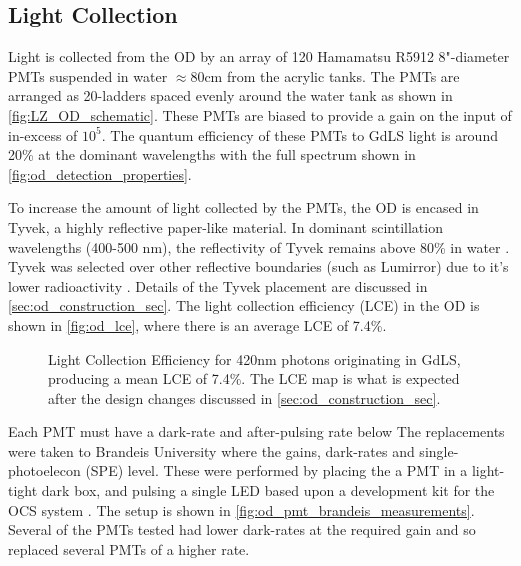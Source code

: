 \subsection{Light Collection}
\par
Light is collected from the OD by an array of 120 Hamamatsu R5912 8"-diameter PMTs suspended in water $\approx$80cm from the acrylic tanks.
The PMTs are arranged as 20-ladders spaced evenly around the water tank as shown in \autoref{fig:LZ_OD_schematic}.
These PMTs are biased to provide a gain on the input of in-excess of $10^{5}$.
The quantum efficiency of these PMTs to GdLS light is around 20\% at the dominant wavelengths with the full spectrum shown in \autoref{fig:od_detection_properties}.

\par
To increase the amount of light collected by the PMTs, the OD is encased in Tyvek, a highly reflective paper-like material.
In dominant scintillation wavelengths (400-500 nm), the reflectivity of Tyvek remains above 80\% in water \cite{tyvek_thesis_ref,tyvek_reflectivity_ref}. 
Tyvek was selected over other reflective boundaries (such as Lumirror{\texttrademark}) due to it's lower radioactivity \cite{LZ_assay_ref}.
Details of the Tyvek placement are discussed in \autoref{sec:od_construction_sec}.
The light collection efficiency (LCE) in the OD is shown in \autoref{fig:od_lce}, where there is an average LCE of 7.4\%.

\begin{figure}
\centering
\resizebox{\textwidth}{!}{

}
\caption[Light Collection Efficiency for 420nm photons originating in GdLS]{Light Collection Efficiency for 420nm photons originating in GdLS, producing a mean LCE of 7.4\%.
The LCE map is what is expected after the design changes discussed in \autoref{sec:od_construction_sec}.}
\label{fig:od_lce}
\end{figure}

%

\iffalse

\par
Each PMT must have a dark-rate and after-pulsing rate below 
The replacements were taken to Brandeis University where the gains, dark-rates and single-photoelecon (SPE) level.
These were performed by placing the a PMT in a light-tight dark box, and pulsing a single LED based upon a development kit for the OCS system \cite{lz_ocs_system_ref}.
The setup is shown in \autoref{fig:od_pmt_brandeis_measurements}.
Several of the PMTs tested had lower dark-rates at the required gain and so replaced several PMTs of a higher rate.

